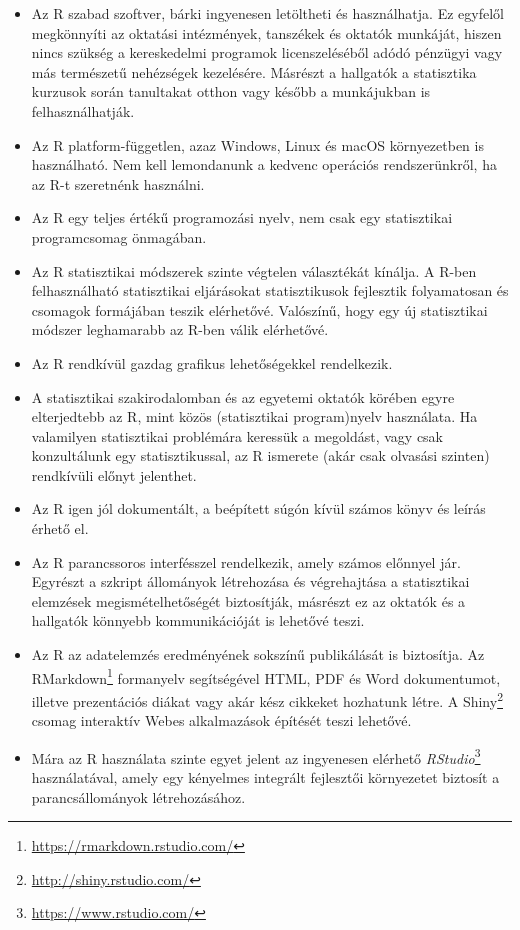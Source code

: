 \documentclass[
]{book}
\DeclareRobustCommand{\href}[2]{#2\footnote{\url{#1}}}
\providecommand{\tightlist}{%
  \setlength{\itemsep}{0pt}\setlength{\parskip}{0pt}}
\begin{document}
\begin{itemize}
\tightlist
\item
  Az R szabad szoftver, bárki ingyenesen letöltheti és használhatja. Ez egyfelől megkönnyíti az oktatási intézmények, tanszékek és oktatók munkáját, hiszen nincs szükség a kereskedelmi programok licenszeléséből adódó pénzügyi vagy más természetű nehézségek kezelésére. Másrészt a hallgatók a statisztika kurzusok során tanultakat otthon vagy később a munkájukban is felhasználhatják.
\item
  Az R platform-független, azaz Windows, Linux és macOS környezetben is használható. Nem kell lemondanunk a kedvenc operációs rendszerünkről, ha az R-t szeretnénk használni.
\item
  Az R egy teljes értékű programozási nyelv, nem csak egy statisztikai programcsomag önmagában.
\item
  Az R statisztikai módszerek szinte végtelen választékát kínálja. A R-ben felhasználható statisztikai eljárásokat statisztikusok fejlesztik folyamatosan és csomagok formájában teszik elérhetővé. Valószínű, hogy egy új statisztikai módszer leghamarabb az R-ben válik elérhetővé.
\item
  Az R rendkívül gazdag grafikus lehetőségekkel rendelkezik.
\item
  A statisztikai szakirodalomban és az egyetemi oktatók körében egyre elterjedtebb az R, mint közös (statisztikai program)nyelv használata. Ha valamilyen statisztikai problémára keressük a megoldást, vagy csak konzultálunk egy statisztikussal, az R ismerete (akár csak olvasási szinten) rendkívüli előnyt jelenthet.
\item
  Az R igen jól dokumentált, a beépített súgón kívül számos könyv és leírás érhető el.
\item
  Az R parancssoros interfésszel rendelkezik, amely számos előnnyel jár. Egyrészt a szkript állományok létrehozása és végrehajtása a statisztikai elemzések megismételhetőségét biztosítják, másrészt ez az oktatók és a hallgatók könnyebb kommunikációját is lehetővé teszi.
\item
  Az R az adatelemzés eredményének sokszínű publikálását is biztosítja. Az \href{https://rmarkdown.rstudio.com/}{RMarkdown} formanyelv segítségével HTML, PDF és Word dokumentumot, illetve prezentációs diákat vagy akár kész cikkeket hozhatunk létre. A \href{http://shiny.rstudio.com/}{Shiny} csomag interaktív Webes alkalmazások építését teszi lehetővé.
\item
  Mára az R használata szinte egyet jelent az ingyenesen elérhető \href{https://www.rstudio.com/}{\emph{RStudio}} használatával, amely egy kényelmes integrált fejlesztői környezetet biztosít a parancsállományok létrehozásához.
\end{itemize}
\end{document}
